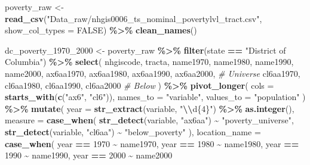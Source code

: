 \documentclass[
]{article}
\newenvironment{Shaded}{\begin{snugshade}}{\end{snugshade}}
\newcommand{\AttributeTok}[1]{\textcolor[rgb]{0.13,0.29,0.53}{#1}}
\newcommand{\CommentTok}[1]{\textcolor[rgb]{0.56,0.35,0.01}{\textit{#1}}}
\newcommand{\ConstantTok}[1]{\textcolor[rgb]{0.56,0.35,0.01}{#1}}
\newcommand{\DecValTok}[1]{\textcolor[rgb]{0.00,0.00,0.81}{#1}}
\newcommand{\FunctionTok}[1]{\textcolor[rgb]{0.13,0.29,0.53}{\textbf{#1}}}
\newcommand{\NormalTok}[1]{#1}
\newcommand{\OtherTok}[1]{\textcolor[rgb]{0.56,0.35,0.01}{#1}}
\newcommand{\SpecialCharTok}[1]{\textcolor[rgb]{0.81,0.36,0.00}{\textbf{#1}}}
\newcommand{\StringTok}[1]{\textcolor[rgb]{0.31,0.60,0.02}{#1}}
\begin{document}
\begin{Shaded}
\begin{Highlighting}[]
\NormalTok{poverty\_raw }\OtherTok{\textless{}{-}} \FunctionTok{read\_csv}\NormalTok{(}\StringTok{"Data\_raw/nhgis0006\_ts\_nominal\_povertylvl\_tract.csv"}\NormalTok{, }\AttributeTok{show\_col\_types =} \ConstantTok{FALSE}\NormalTok{) }\SpecialCharTok{\%\textgreater{}\%}
  \FunctionTok{clean\_names}\NormalTok{()}

\NormalTok{dc\_poverty\_1970\_2000 }\OtherTok{\textless{}{-}}\NormalTok{ poverty\_raw }\SpecialCharTok{\%\textgreater{}\%}
  \FunctionTok{filter}\NormalTok{(state }\SpecialCharTok{==} \StringTok{"District of Columbia"}\NormalTok{) }\SpecialCharTok{\%\textgreater{}\%}
  \FunctionTok{select}\NormalTok{(}
\NormalTok{    nhgiscode, tracta,}
\NormalTok{    name1970, name1980, name1990, name2000,}
\NormalTok{    ax6aa1970, ax6aa1980, ax6aa1990, ax6aa2000, }\CommentTok{\# Universe}
\NormalTok{    cl6aa1970, cl6aa1980, cl6aa1990, cl6aa2000  }\CommentTok{\# Below}
\NormalTok{  ) }\SpecialCharTok{\%\textgreater{}\%}
  \FunctionTok{pivot\_longer}\NormalTok{(}
    \AttributeTok{cols =} \FunctionTok{starts\_with}\NormalTok{(}\FunctionTok{c}\NormalTok{(}\StringTok{"ax6"}\NormalTok{, }\StringTok{"cl6"}\NormalTok{)),}
    \AttributeTok{names\_to =} \StringTok{"variable"}\NormalTok{,}
    \AttributeTok{values\_to =} \StringTok{"population"}
\NormalTok{  ) }\SpecialCharTok{\%\textgreater{}\%}
  \FunctionTok{mutate}\NormalTok{(}
    \AttributeTok{year =} \FunctionTok{str\_extract}\NormalTok{(variable, }\StringTok{"}\SpecialCharTok{\textbackslash{}\textbackslash{}}\StringTok{d\{4\}"}\NormalTok{) }\SpecialCharTok{\%\textgreater{}\%} \FunctionTok{as.integer}\NormalTok{(),}
    \AttributeTok{measure =} \FunctionTok{case\_when}\NormalTok{(}
      \FunctionTok{str\_detect}\NormalTok{(variable, }\StringTok{"ax6aa"}\NormalTok{) }\SpecialCharTok{\textasciitilde{}} \StringTok{"poverty\_universe"}\NormalTok{,}
      \FunctionTok{str\_detect}\NormalTok{(variable, }\StringTok{"cl6aa"}\NormalTok{) }\SpecialCharTok{\textasciitilde{}} \StringTok{"below\_poverty"}
\NormalTok{    ),}
    \AttributeTok{location\_name =} \FunctionTok{case\_when}\NormalTok{(}
\NormalTok{      year }\SpecialCharTok{==} \DecValTok{1970} \SpecialCharTok{\textasciitilde{}}\NormalTok{ name1970,}
\NormalTok{      year }\SpecialCharTok{==} \DecValTok{1980} \SpecialCharTok{\textasciitilde{}}\NormalTok{ name1980,}
\NormalTok{      year }\SpecialCharTok{==} \DecValTok{1990} \SpecialCharTok{\textasciitilde{}}\NormalTok{ name1990,}
\NormalTok{      year }\SpecialCharTok{==} \DecValTok{2000} \SpecialCharTok{\textasciitilde{}}\NormalTok{ name2000}

\end{Highlighting}
\end{Shaded}
\end{document}

